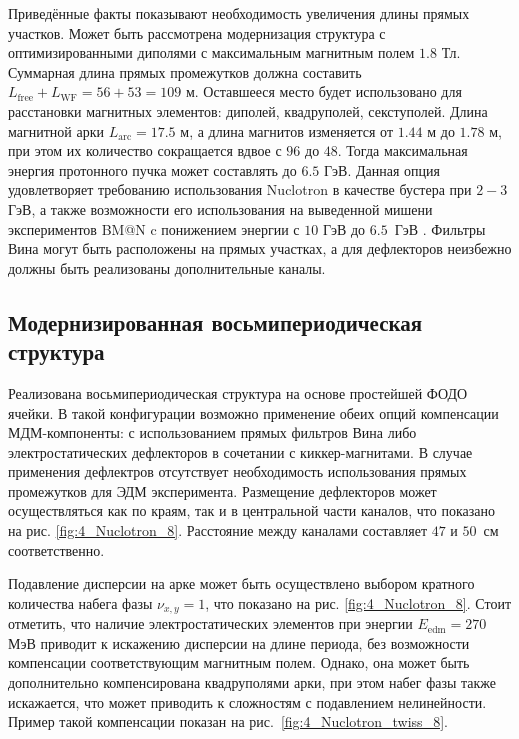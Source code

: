\par Приведённые факты показывают необходимость увеличения длины прямых участков. Может быть рассмотрена модернизация структура с оптимизированными диполями с максимальным магнитным полем $1.8$ Тл. Суммарная длина прямых промежутков должна составить $L_{\text{free}}+L_{\text{WF}}=56+53 = 109$ м. Оставшееся место будет использовано для расстановки магнитных элементов: диполей, квадруполей, секступолей. Длина магнитной арки $L_{\textrm{arc}}=17.5$ м, а длина магнитов изменяется от $1.44$ м до $1.78$ м, при этом их количество сокращается вдвое с $96$ до $48$. Тогда максимальная энергия протонного пучка может составлять до $6.5$ ГэВ. Данная опция удовлетворяет требованию использования Nuclotron в качестве бустера при $2-3$ ГэВ, а также возможности его использования на выведенной мишени экспериментов BM@N c понижением энергии с $10$ ГэВ до $6.5$~ГэВ \cite{kovalenko:nuclotron}. Фильтры Вина могут быть расположены на прямых участках, а для дефлекторов неизбежно должны быть реализованы дополнительные каналы.

	\subsection{Модернизированная восьмипериодическая структура}\label{sec:EDM/optics/8period}

\par Реализована восьмипериодическая структура на основе простейшей ФОДО ячейки. В такой конфигурации возможно применение обеих опций компенсации МДМ-компоненты: с использованием прямых фильтров Вина либо электростатических дефлекторов в сочетании с киккер-магнитами. В случае применения дефлектров отсутствует необходимость использования прямых промежутков для ЭДМ эксперимента. Размещение дефлекторов может осуществляться как по краям, так и в центральной части каналов, что показано на рис. \ref{fig:4_Nuclotron_8}. Расстояние между каналами составляет $47$ и $50$~см соответственно.

\par Подавление дисперсии на арке может быть осуществлено выбором кратного количества набега фазы $\nu_{x,y} = 1$, что показано на рис. \ref{fig:4_Nuclotron_8}. Стоит отметить, что наличие электростатических элементов при энергии $E_{\textrm{edm}}=270$ МэВ приводит к искажению дисперсии на длине периода, без возможности компенсации соответствующим магнитным полем. Однако, она может быть дополнительно компенсирована квадруполями арки, при этом набег фазы также искажается, что может приводить к сложностям с подавлением нелинейности. Пример такой компенсации показан на рис.~\ref{fig:4_Nuclotron_twiss_8}.

